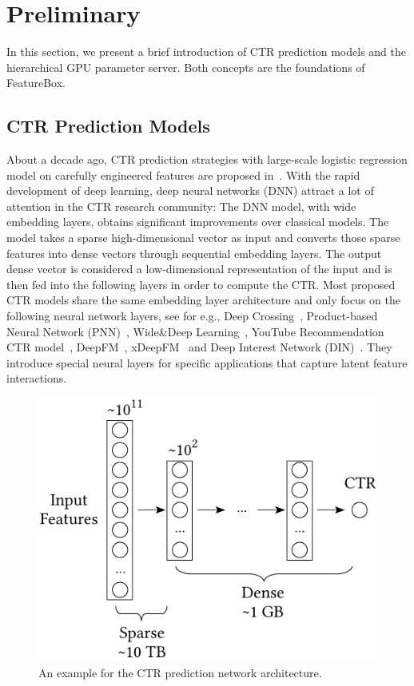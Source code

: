\documentclass[sigconf]{acmart}
\begin{document}
\section{Preliminary}
In this section, we present a brief introduction of CTR prediction models and the hierarchical GPU parameter server. Both concepts are the foundations of FeatureBox. 

\subsection{CTR Prediction Models}
About a decade ago, CTR prediction strategies with large-scale logistic regression model on carefully engineered features are proposed in~\cite{edelman2007internet,graepel2010web}. With the rapid development of deep learning, deep neural networks (DNN) attract a lot of attention in the CTR research community: The DNN model, with wide embedding layers, obtains significant improvements over classical models. The model takes a sparse high-dimensional vector as input and converts those sparse features into dense vectors through sequential embedding layers. The output dense vector is considered a low-dimensional representation of the input and is then fed into the following layers in order to compute the CTR. Most proposed CTR models share the same embedding layer architecture and only focus on the following neural network layers, see for e.g., Deep Crossing~\cite{shan2016deep}, Product-based Neural Network (PNN)~\cite{qu2016product}, Wide\&Deep Learning~\cite{cheng2016wide}, YouTube Recommendation CTR model~\cite{covington2016deep}, DeepFM~\cite{guo2017deepfm}, xDeepFM~\cite{lian2018xdeepfm} and Deep Interest Network (DIN)~\cite{zhou2018deep}. They introduce special neural layers for specific applications that capture latent feature interactions. 

\begin{figure}[htbp]

\centering
\includegraphics[width=.35\textwidth]{figs/ctr2}

\caption{An example for the CTR prediction network architecture.}
\label{fig:ctr}%
\end{figure}
\end{document}
